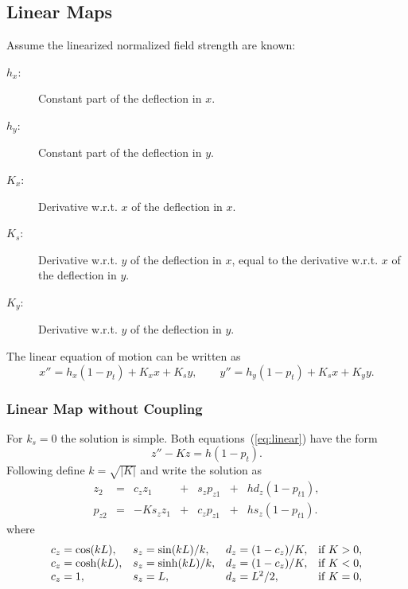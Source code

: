 \documentclass{report}
\begin{document}
\subsection{Linear Maps}
Assume the linearized normalized field strength are known:
\begin{description}
\item[$h_x$:] 
  Constant part of the deflection in $x$.
\item[$h_y$:] 
  Constant part of the deflection in $y$.
\item[$K_x$:]
  Derivative w.r.t. $x$ of the deflection in $x$.
\item[$K_s$:] 
  Derivative w.r.t. $y$ of the deflection in $x$,
  equal to the derivative w.r.t. $x$ of the deflection in $y$.
\item[$K_y$:] 
  Derivative w.r.t. $y$ of the deflection in $y$.
\end{description}
The linear equation of motion can be written as
\begin{equation}
  x'' = h_x (1 - p_t) + K_x x + K_s y, \qquad
  y'' = h_y (1 - p_t) + K_s x + K_y y.
  \label{eq:linear}
\end{equation}

\subsubsection{Linear Map without Coupling}
For $k_s=0$ the solution is simple.
Both equations~(\ref{eq:linear}) have the form
\begin{equation}
  z'' - K z = h (1 - p_t).
\end{equation}
Following \cite{SLAC-75} define $k = \sqrt{|K|}$ and write the
solution as
\begin{equation}
  \begin{array}{lcrcrcr}
    z_2 &=& c_z z_1 &+& s_z p_{z1} &+& h d_z (1 - p_{t1}), \\
    p_{z2} &=& -K s_z z_1 &+& c_z p_{z1} &+& h s_z (1 - p_{t1}).
  \end{array}
\end{equation}
where
\begin{equation}
  \begin{array}{llll}
    c_z = \cos(kL), & s_z = \sin(kL)/k, &
    d_z = (1 - c_z) / K, & \hbox{if $K > 0$}, \\
    c_z = \cosh(kL), & s_z = \sinh(kL)/k, &
    d_z = (1 - c_z) / K, & \hbox{if $K < 0$}, \\
    c_z = 1, & s_z = L, & d_z = L^2/2, & \hbox{if $K = 0$}, \\
  \end{array}
\end{equation}
\end{document}
